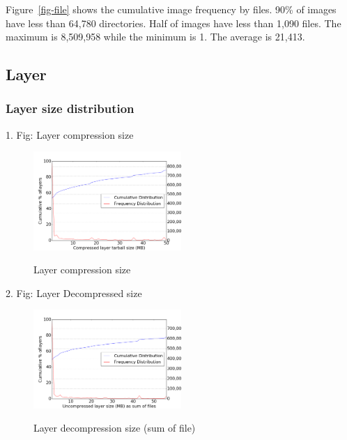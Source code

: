 Figure~\ref{fig-file} shows the cumulative image frequency by files. 90\% of images have less than 64,780 directories. Half of images have less than 1,090 files. The maximum is 8,509,958 while the minimum is 1. The average is 21,413. 

\subsection{Layer}

\subsubsection{Layer size distribution}

1. Fig: Layer compression size

\begin{figure}
	\centering
	\includegraphics[width=0.5\textwidth]{graphs/Compressed_layer_tarball_size_(MB).png}\\
	\caption{Layer compression size}\label{fig_image_size_compression}
\end{figure}

2. Fig: Layer Decompressed size

\begin{figure}
	\centering
	\includegraphics[width=0.5\textwidth]{graphs/Uncompressed_layer_size_(MB)_as_sum_of_files.png}\\
	\caption{Layer decompression size (sum of file)}\label{fig_image_size_compression}
\end{figure}


